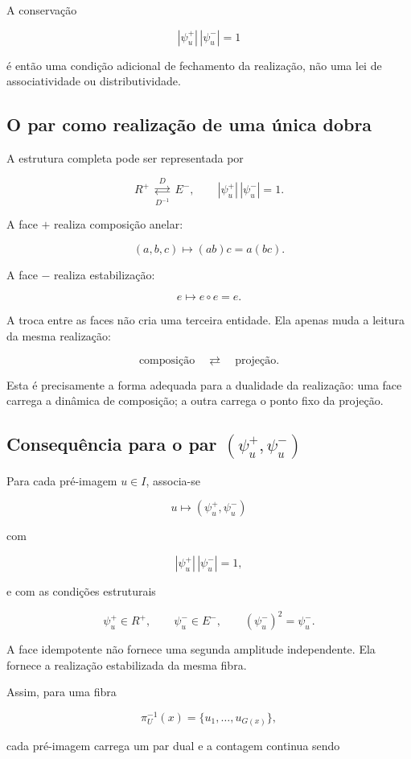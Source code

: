 \documentclass[11pt,a4paper]{article}
\begin{document}
A conservação

$$
|\psi_u^+|\,|\psi_u^-|=1
$$

é então uma condição adicional de fechamento da realização, não uma lei
de associatividade ou distributividade.

\subsection{O par como realização de uma única dobra}

A estrutura completa pode ser representada por

$$
\boxed{
R^+
\ \underset{D^{-1}}{\overset{D}{\rightleftarrows}}\
E^-,
\qquad
|\psi_u^+|\,|\psi_u^-|=1.
}
$$

A face \(+\) realiza composição anelar:

$$
(a,b,c)\mapsto (ab)c=a(bc).
$$

A face \(-\) realiza estabilização:

$$
e\mapsto e\circ e=e.
$$

A troca entre as faces não cria uma terceira entidade. Ela apenas muda a
leitura da mesma realização:

$$
\boxed{
\text{composição}
\quad\rightleftarrows\quad
\text{projeção}.
}
$$

Esta é precisamente a forma adequada para a dualidade da realização:
uma face carrega a dinâmica de composição; a outra carrega o ponto fixo
da projeção.

\subsection{Consequência para o par \((\psi_u^+,\psi_u^-)\)}

Para cada pré-imagem \(u\in I\), associa-se

$$
u\longmapsto(\psi_u^+,\psi_u^-)
$$

com

$$
\boxed{
|\psi_u^+|\,|\psi_u^-|=1,
}
$$

e com as condições estruturais

$$
\boxed{
\psi_u^+\in R^+,
\qquad
\psi_u^-\in E^-,
\qquad
(\psi_u^-)^2=\psi_u^-.
}
$$

A face idempotente não fornece uma segunda amplitude independente.
Ela fornece a realização estabilizada da mesma fibra.

Assim, para uma fibra

$$
\pi_U^{-1}(x)=\{u_1,\ldots,u_{G(x)}\},
$$

cada pré-imagem carrega um par dual e a contagem continua sendo
\end{document}
